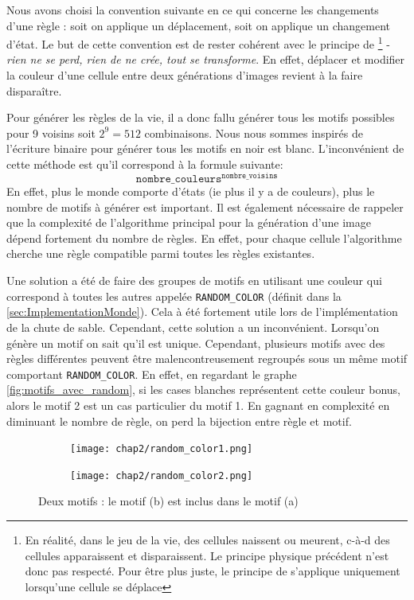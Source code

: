 Nous avons choisi la convention suivante en ce qui concerne les changements d'une règle : soit on applique un déplacement, soit on applique un changement d'état. Le but de cette convention est de rester cohérent avec le principe de  \footnote{En réalité, dans le jeu de la vie, des cellules naissent ou meurent, c-à-d des cellules apparaissent et disparaissent. Le principe physique précédent n'est donc pas respecté. Pour être plus juste, le principe de  s'applique uniquement lorsqu'une cellule se déplace} - \emph{rien ne se perd, rien de ne crée, tout se transforme}. En effet, déplacer et modifier la couleur d'une cellule entre deux générations d'images revient à la faire disparaître.

Pour générer les règles de la vie, il a donc fallu générer tous les motifs possibles pour 9 voisins soit $2^9 = 512$ combinaisons. Nous nous sommes inspirés de l'écriture binaire pour générer tous les motifs en noir est blanc. L'inconvénient de cette méthode est qu'il correspond à la formule suivante: $$\texttt{nombre\_couleurs}^\texttt{nombre\_voisins} $$
En effet, plus le monde comporte d'états (ie plus il y a de couleurs), plus le nombre de motifs à générer est important. Il est également nécessaire de rappeler que la complexité de l'algorithme principal pour la génération d'une image dépend fortement du nombre de règles. En effet, pour chaque cellule l'algorithme cherche une règle compatible parmi toutes les règles existantes.

Une solution a été de faire des groupes de motifs en utilisant une couleur qui correspond à toutes les autres appelée \texttt{RANDOM\_COLOR} (définit dans la \autoref{sec:ImplementationMonde}). Cela à été fortement utile lors de l'implémentation de la chute de sable. Cependant, cette solution a un inconvénient. Lorsqu'on génère un motif on sait qu'il est unique. Cependant, plusieurs motifs avec des règles différentes peuvent être malencontreusement regroupés sous un même motif comportant \texttt{RANDOM\_COLOR}. En effet, en regardant le graphe \autoref{fig:motifs_avec_random}, si les cases blanches représentent cette couleur bonus, alors le motif 2 est un cas particulier du motif 1. En gagnant en complexité en diminuant le nombre de règle, on perd la bijection entre règle et motif.

\begin{figure}[ht]
    \centering
    \hspace*{\fill}
    \begin{subfigure}{0.3\textwidth}
        \centering
        \texttt{[image: chap2/random\_color1.png]}
        \label{fig:motif2}
    \end{subfigure}
    \hfill
    \begin{subfigure}{0.3\textwidth}
        \centering
        \texttt{[image: chap2/random\_color2.png]}
        \label{fig:motif1}
    \end{subfigure}
    \hspace*{\fill}
    \caption{Deux motifs : le motif (b) est inclus dans le motif (a)}
    \label{fig:motifs_avec_random}
\end{figure}

